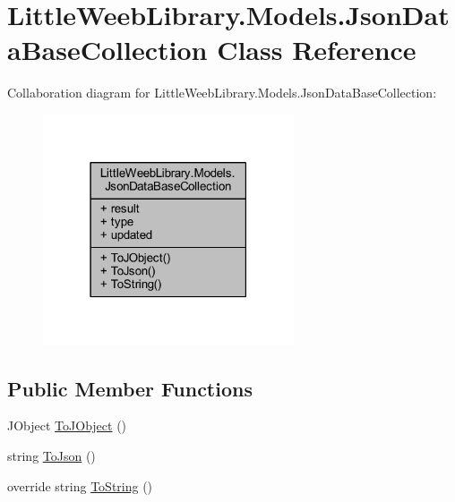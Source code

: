 \hypertarget{class_little_weeb_library_1_1_models_1_1_json_data_base_collection}{}\section{Little\+Weeb\+Library.\+Models.\+Json\+Data\+Base\+Collection Class Reference}
\label{class_little_weeb_library_1_1_models_1_1_json_data_base_collection}


Collaboration diagram for Little\+Weeb\+Library.\+Models.\+Json\+Data\+Base\+Collection\+:\nopagebreak
\begin{figure}[H]
\begin{center}
\leavevmode
\includegraphics[width=210pt]{class_little_weeb_library_1_1_models_1_1_json_data_base_collection__coll__graph}
\end{center}
\end{figure}
\subsection*{Public Member Functions}
\begin{DoxyCompactItemize}
\item 
J\+Object \mbox{\hyperlink{class_little_weeb_library_1_1_models_1_1_json_data_base_collection_abb41335632171ada7d3003a69a388392}{To\+J\+Object}} ()
\item 
string \mbox{\hyperlink{class_little_weeb_library_1_1_models_1_1_json_data_base_collection_a2df5ba56e4691271213328b9bc2dbb1f}{To\+Json}} ()
\item 
override string \mbox{\hyperlink{class_little_weeb_library_1_1_models_1_1_json_data_base_collection_ac50c3070bcc5af0ca9f223bb88a1ef6c}{To\+String}} ()
\end{DoxyCompactItemize}
